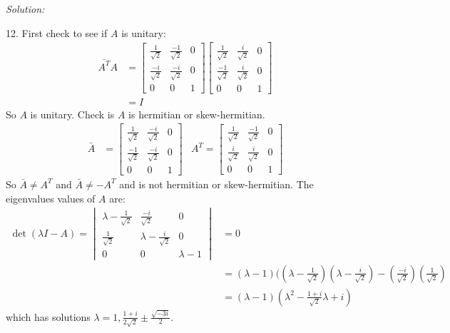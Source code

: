 \documentclass[11pt]{homework}
\begin{document}
\emph{Solution:}
\newline

12. First check to see if $A$ is unitary:
\begin{align*}
\bar{A^T}A &=
  \begin{bmatrix}
    \frac{1}{\sqrt{2}} & \frac{-1}{\sqrt{2}} & 0 \\
    \frac{-i}{\sqrt{2}} & \frac{-i}{\sqrt{2}} & 0 \\
    0 & 0 & 1
  \end{bmatrix}
  \begin{bmatrix}
    \frac{1}{\sqrt{2}} & \frac{i}{\sqrt{2}} & 0 \\
    \frac{-1}{\sqrt{2}} & \frac{i}{\sqrt{2}} & 0 \\
    0 & 0 & 1
  \end{bmatrix} \\
  &= I
\end{align*}
So $A$ is unitary.
Check is $A$ is hermitian or skew-hermitian.
\begin{align*}
\bar{A} &=
  \begin{bmatrix}
    \frac{1}{\sqrt{2}} & \frac{-i}{\sqrt{2}} & 0 \\
    \frac{-1}{\sqrt{2}} & \frac{-i}{\sqrt{2}} & 0 \\
    0 & 0 & 1
  \end{bmatrix}
&A^T =
  \begin{bmatrix}
    \frac{1}{\sqrt{2}} & \frac{-1}{\sqrt{2}} & 0 \\
    \frac{i}{\sqrt{2}} & \frac{i}{\sqrt{2}} & 0 \\
    0 & 0 & 1
  \end{bmatrix}
\end{align*}
So $\bar{A} \neq A^T$ and $\bar{A} \neq -A^T$
and is not hermitian or skew-hermitian.
The eigenvalues values of $A$ are:
\begin{align*}
\det(\lambda I - A) = 
  \begin{vmatrix}
  \lambda-\frac{1}{\sqrt{2}} & \frac{-i}{\sqrt{2}} & 0 \\
  \frac{1}{\sqrt{2}} & \lambda-\frac{i}{\sqrt{2}} & 0 \\
  0 & 0 & \lambda-1
  \end{vmatrix}
  &= 0\\
  &= (\lambda-1)((\lambda - \frac{1}{\sqrt{2}})(\lambda-\frac{i}{\sqrt{2}}) - (\frac{-i}{\sqrt{2}})(\frac{1}{\sqrt{2}}) \\
  &= (\lambda-1) (\lambda^2 - \frac{1+i}{\sqrt{2}}\lambda +i) 
\end{align*}
which has solutions $\lambda = 1, \frac{1+i}{2\sqrt{2}} \pm \frac{\sqrt{-3i}}{2}$.
\end{document}
